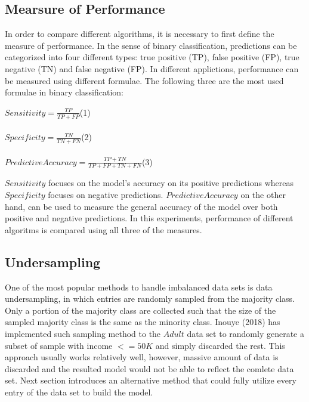 \documentclass{article}
\begin{document}
\subsection{Mearsure of Performance}
\label{measure_of_performance}

In order to compare different algorithms, it is necessary to first define the measure of performance. In the sense of binary classification, predictions can be categorized into four different types: true positive (TP), false positive (FP), true negative (TN) and false negative (FP). In different applictions, performance can be measured using different formulae. The following three are the most used formulae in binary classification:\\
\begin{center}
\hfill$Sensitivity=\frac{TP}{TP+FP}$\hfill (1)\\\hfill\\
\hfill$Specificity=\frac{TN}{TN+FN}$\hfill (2)\\\hfill\\
\hfill$Predictive Accuracy=\frac{TP+TN}{TP+FP+TN+FN}$\hfill (3)\\
\end{center}
$Sensitivity$ focuses on the model's accuracy on its positive predictions whereas $Specificity$ focuses on negative predictions. $Predictive Accuracy$ on the other hand, can be used to measure the general accuracy of the model over both positive and negative predictions. In this experiments, performance of different algoritms is compared using all three of the measures.

\subsection{Undersampling}
\label{undersampling}

One of the most popular methods to handle imbalanced data sets is data undersampling, in which entries are randomly sampled from the majority class. Only a portion of the majority class are collected such that the size of the sampled majority class is the same as the minority class. Inouye (2018) has implemented such sampling method to the $Adult$ data set to randomly generate a subset of sample with income $<=50K$ and simply discarded the rest. This approach usually works relatively well, however, massive amount of data is discarded and the resulted model would not be able to reflect the comlete data set. Next section introduces an alternative method that could fully utilize every entry of the data set to build the model.
\end{document}
